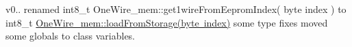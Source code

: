 v0.. renamed int8\+\_\+t One\+Wire\+\_\+mem\+::get1wire\+From\+Eeprom\+Index( byte index ) to int8\+\_\+t \mbox{\hyperlink{class_one_wire__mem_a825507ec70be0783b2c9b84a2ed86b39}{One\+Wire\+\_\+mem\+::load\+From\+Storage(byte index)}} some type fixes moved some globals to class variables. 
